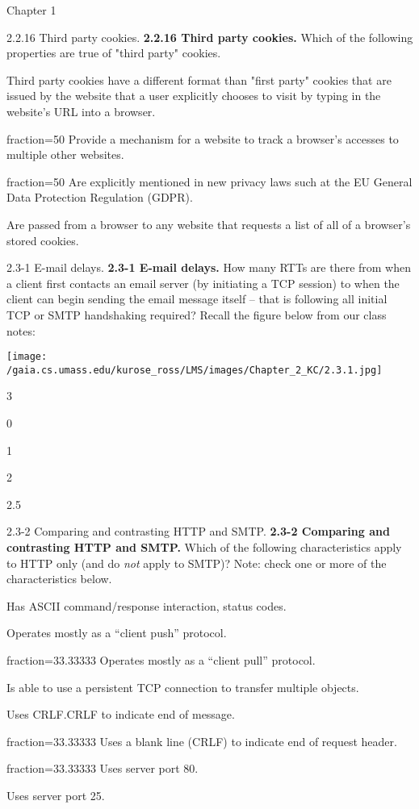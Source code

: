 \documentclass[a4paper]{article}
\begin{document}
\begin{quiz}{Chapter 1}
\begin{multi}[points=1,shuffle,multiple]{2.2.16 Third party cookies.}
\textbf{2.2.16 Third party cookies.} Which of the following properties are true of "third party" cookies.
\item Third party cookies have a different format than "first party" cookies that are issued by the website that a user explicitly chooses to visit by typing in the website's URL into a browser.
\item[fraction=50] Provide a mechanism for a website to track a browser's accesses to multiple other websites.
\item[fraction=50] Are explicitly mentioned in new privacy laws such at the EU General Data Protection Regulation (GDPR).
\item Are passed from a browser to any website that requests a list of all of a browser's stored cookies.
\end{multi}

\begin{multi}[points=1,shuffle]{2.3-1 E-mail delays.}
\textbf{2.3-1 E-mail delays.} How many RTTs are there from when a client first contacts an email server (by initiating a TCP session) to when the client can begin sending the email message itself – that is following all initial TCP or SMTP handshaking required? Recall the figure below from our class notes: 
\begin{center}
\texttt{[image: /gaia.cs.umass.edu/kurose\_ross/LMS/images/Chapter\_2\_KC/2.3.1.jpg]}
\end{center}

\item* 3
\item 0
\item 1
\item 2
\item 2.5
\end{multi}

\begin{multi}[points=1,shuffle,multiple]{2.3-2 Comparing and contrasting HTTP and SMTP.}
\textbf{2.3-2 Comparing and contrasting HTTP and SMTP.} Which of the following characteristics apply to HTTP only (and do \emph{not} apply to SMTP)?  Note: check one or more of the characteristics below.
\item Has ASCII command/response interaction, status codes.
\item Operates mostly as a “client push” protocol.
\item[fraction=33.33333] Operates mostly as a “client pull” protocol.
\item Is able to use a persistent TCP connection to transfer multiple objects.
\item Uses CRLF.CRLF to indicate end of message.
\item[fraction=33.33333] Uses a blank line (CRLF) to indicate end of request header.
\item[fraction=33.33333] Uses server port 80.
\item Uses server port 25.
\end{multi}


\end{quiz}
\end{document}
